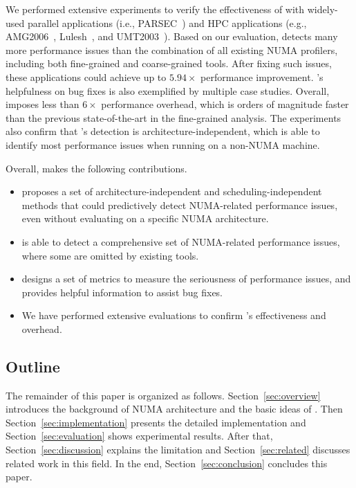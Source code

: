 We performed extensive experiments to verify the effectiveness of \NP{} with widely-used parallel applications (i.e., PARSEC~\cite{parsec}) and HPC applications (e.g., AMG2006~\cite{}, Lulesh~\cite{}, and UMT2003~\cite{}).  Based on our evaluation, \NP{} detects many more performance issues than the combination of all existing NUMA profilers, including both fine-grained and coarse-grained tools. After fixing such issues, these applications could achieve up to $5.94\times$ performance improvement.  \NP{}'s helpfulness on bug fixes is also exemplified by multiple case studies. Overall, \NP{} imposes less than $6\times$ performance overhead, which is orders of magnitude faster than the previous state-of-the-art in the fine-grained analysis. The experiments also confirm that \NP{}'s detection is architecture-independent, which is able to identify most performance issues when running on a non-NUMA machine. 

Overall, \NP{} makes the following contributions. 

\begin{itemize}
    \item \NP{} proposes a set of architecture-independent and scheduling-independent methods that could predictively detect NUMA-related performance issues, even without evaluating on a specific NUMA architecture. 
    \item \NP{} is able to detect a comprehensive set of NUMA-related performance issues, where some are omitted by existing tools. 
    
    \item \NP{} designs a set of metrics to measure the seriousness of performance issues, and provides helpful information to assist bug fixes.
    \item We have performed extensive evaluations to confirm \NP{}'s effectiveness and overhead.  
\end{itemize}


\subsection*{Outline}

The remainder of this paper is organized as follows. Section~\ref{sec:overview} introduces the background of NUMA architecture and the basic ideas of \NP{}. Then Section~\ref{sec:implementation} presents the detailed implementation and Section~\ref{sec:evaluation} shows experimental results. After that, Section~\ref{sec:discussion} explains the limitation and  Section~\ref{sec:related} discusses related work in this field. In the end, Section~\ref{sec:conclusion} concludes this paper.


